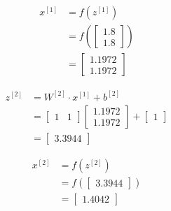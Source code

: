 \documentclass[12pt]{article}
\begin{document}
\begin{enumerate}[leftmargin=\labelsep]
\begin{paracol}{3}
              $$
                  \begin{aligned}
                      x^{[1]} & = f(z^{[1]})                  \\
                              & = f\left(\begin{bmatrix}{}
                                                 1.8 \\
                                                 1.8
                                             \end{bmatrix}\right) \\
                              & = \begin{bmatrix}{}
                                      1.1972 \\
                                      1.1972
                                  \end{bmatrix}
                  \end{aligned}
              $$

              $$
                  \begin{aligned}
                      z^{[2]} & = W^{[2]} \cdot x^{[1]} + b^{[2]} \\
                              & = \begin{bmatrix}
                                      1 &
                                      1
                                  \end{bmatrix}
                      \begin{bmatrix}
                          1.1972 \\
                          1.1972
                      \end{bmatrix}
                      +
                      \begin{bmatrix}
                          1
                      \end{bmatrix}                              \\
                              & = \begin{bmatrix}{}
                                      3.3944
                                  \end{bmatrix}
                  \end{aligned}
              $$

              $$
                  \begin{aligned}
                      x^{[2]} & = f(z^{[2]})                  \\
                              & = f\left(\begin{bmatrix}{}
                                                 3.3944
                                             \end{bmatrix}\right) \\
                              & = \begin{bmatrix}{}
                                      1.4042
                                  \end{bmatrix}
                  \end{aligned}
              $$


\end{paracol}
\end{enumerate}
\end{document}
